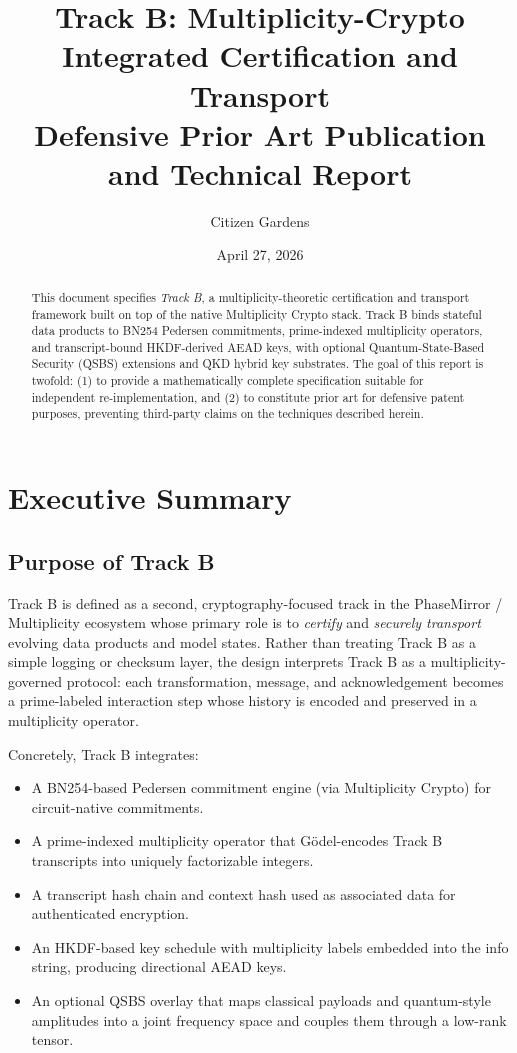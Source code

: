 \documentclass[11pt]{article}
\title{Track B: Multiplicity-Crypto Integrated Certification and Transport\\
Defensive Prior Art Publication and Technical Report}
\author{Citizen Gardens}
\affil{The Foundation of Multiplicity}
\date{April 27, 2026}
\begin{document}
\maketitle

\begin{abstract}
This document specifies \emph{Track B}, a multiplicity-theoretic certification and transport framework built on top of the native Multiplicity Crypto stack.
Track B binds stateful data products to BN254 Pedersen commitments, prime-indexed multiplicity operators, and transcript-bound HKDF-derived AEAD keys, with optional Quantum-State-Based Security (QSBS) extensions and QKD hybrid key substrates.
The goal of this report is twofold:
(1) to provide a mathematically complete specification suitable for independent re-implementation, and
(2) to constitute prior art for defensive patent purposes, preventing third-party claims on the techniques described herein.
\end{abstract}
\newpage
\tableofcontents
\newpage
\section{Executive Summary}

\subsection{Purpose of Track B}

Track B is defined as a second, cryptography-focused track in the PhaseMirror / Multiplicity ecosystem whose primary role is to \emph{certify} and \emph{securely transport} evolving data products and model states.
Rather than treating Track B as a simple logging or checksum layer, the design interprets Track B as a multiplicity-governed protocol:
each transformation, message, and acknowledgement becomes a prime-labeled interaction step whose history is encoded and preserved in a multiplicity operator.

Concretely, Track B integrates:
\begin{itemize}[leftmargin=1.5em]
  \item A BN254-based Pedersen commitment engine (via Multiplicity Crypto) for circuit-native commitments.
  \item A prime-indexed multiplicity operator that G\"odel-encodes Track B transcripts into uniquely factorizable integers.
  \item A transcript hash chain and context hash used as associated data for authenticated encryption.
  \item An HKDF-based key schedule with multiplicity labels embedded into the info string, producing directional AEAD keys.
  \item An optional QSBS overlay that maps classical payloads and quantum-style amplitudes into a joint frequency space and couples them through a low-rank tensor.
\end{itemize}
\end{document}
